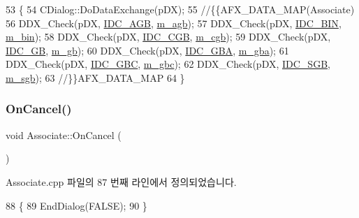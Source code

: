 \begin{DoxyCode}
53 \{
54   CDialog::DoDataExchange(pDX);
55   \textcolor{comment}{//\{\{AFX\_DATA\_MAP(Associate)}
56   DDX\_Check(pDX, \mbox{\hyperlink{resource_8h_a8c7609dfe56d6609e9c1f97228184d39}{IDC\_AGB}}, \mbox{\hyperlink{class_associate_ab6d59a4b47c5529c1e5f5b8f8b5a6f82}{m\_agb}});
57   DDX\_Check(pDX, \mbox{\hyperlink{resource_8h_ab543a279da4259e249c63d545f8167fe}{IDC\_BIN}}, \mbox{\hyperlink{class_associate_ac132c6bfb6f547702c2e7386650a0a4c}{m\_bin}});
58   DDX\_Check(pDX, \mbox{\hyperlink{resource_8h_ad8562cba562aee4a1fd36383f874975d}{IDC\_CGB}}, \mbox{\hyperlink{class_associate_af245524b613121a7a5291deebfb97e0e}{m\_cgb}});
59   DDX\_Check(pDX, \mbox{\hyperlink{resource_8h_ab21a32c39ba96447f6a15198d5b0a5ad}{IDC\_GB}}, \mbox{\hyperlink{class_associate_af4479f05150eb128332d06cba68a955b}{m\_gb}});
60   DDX\_Check(pDX, \mbox{\hyperlink{resource_8h_ab65f3672a37a2ae83ebc6d55bcf0d745}{IDC\_GBA}}, \mbox{\hyperlink{class_associate_a7c20c41d1b724e80532ff888b6c7ea56}{m\_gba}});
61   DDX\_Check(pDX, \mbox{\hyperlink{resource_8h_a312747442828c9328afe0a7d72101cfc}{IDC\_GBC}}, \mbox{\hyperlink{class_associate_a399cc9528f3efc32ec5971fc5e614e97}{m\_gbc}});
62   DDX\_Check(pDX, \mbox{\hyperlink{resource_8h_a16b262a9e742618881e766dc16c0c3db}{IDC\_SGB}}, \mbox{\hyperlink{class_associate_a0221f6743a817911817d464579b4a038}{m\_sgb}});
63   \textcolor{comment}{//\}\}AFX\_DATA\_MAP}
64 \}
\end{DoxyCode}
\mbox{\label{class_associate_a76fb7e63100511a6d22c53cf3306b8f4}} 
\subsubsection{\texorpdfstring{On\+Cancel()}{OnCancel()}}
{\footnotesize\ttfamily void Associate\+::\+On\+Cancel (\begin{DoxyParamCaption}{ }\end{DoxyParamCaption})\hspace{0.3cm}{\ttfamily [protected]}}



Associate.\+cpp 파일의 87 번째 라인에서 정의되었습니다.


\begin{DoxyCode}
88 \{
89   EndDialog(FALSE);
90 \}
\end{DoxyCode}
\mbox{\label{class_associate_a66532001ec5d28abd61684b0f62b032b}} 
